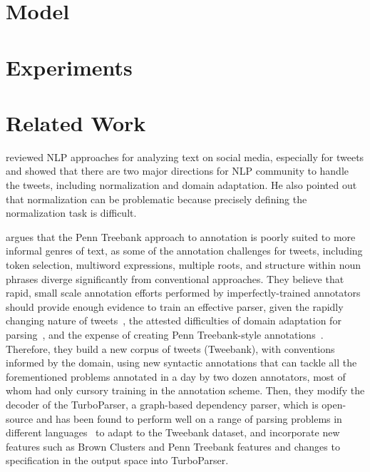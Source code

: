 \documentclass[11pt,letterpaper]{article}
\begin{document}
\section{Model}

\section{Experiments}


\section{Related Work}
 reviewed NLP approaches for analyzing text on social media, especially for tweets and showed that there are two major directions for NLP community to handle the tweets, including normalization and domain adaptation. He also pointed out that normalization can be problematic because precisely defining the normalization task is difficult. 

 argues that the Penn Treebank approach to annotation is poorly suited to more informal genres of text, as some of the annotation challenges for tweets,
including token selection, multiword expressions, multiple roots, and structure within noun phrases diverge significantly from conventional approaches. 
They believe that rapid, small scale annotation efforts performed by imperfectly-trained annotators should provide enough evidence to train an effective parser, given the rapidly changing nature of tweets~\cite{eisenstein:2013:NAACL-HLT}, the attested difficulties of domain adaptation for parsing~\cite{dred07}, and the expense of creating Penn Treebank-style annotations~\cite{penn93}. 
Therefore, they build a new corpus of tweets (Tweebank), with conventions informed by the domain, using new syntactic annotations that can tackle all the forementioned problems annotated in a day by two dozen annotators, most of whom had only cursory training in the annotation scheme. Then, they modify the decoder of the TurboParser, a graph-based dependency parser, which is open-source and has been found to perform well on a range of parsing problems in different languages~\cite{turbo13} to adapt to the Tweebank dataset, and incorporate new features such as Brown Clusters and Penn Treebank features and changes to specification
in the output space into TurboParser.
\end{document}
